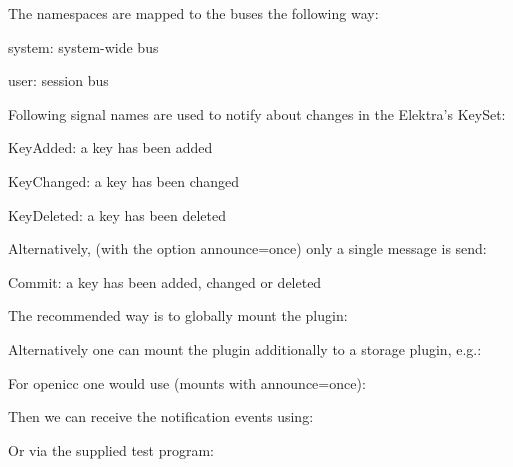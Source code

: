 The namespaces are mapped to the buses the following way\+:


\begin{DoxyItemize}
\item system\+: system-\/wide bus
\item user\+: session bus
\end{DoxyItemize}

Following signal names are used to notify about changes in the Elektra’s Key\+Set\+:


\begin{DoxyItemize}
\item Key\+Added\+: a key has been added
\item Key\+Changed\+: a key has been changed
\item Key\+Deleted\+: a key has been deleted
\end{DoxyItemize}

Alternatively, (with the option announce=once) only a single message is send\+:


\begin{DoxyItemize}
\item Commit\+: a key has been added, changed or deleted
\end{DoxyItemize}

The recommended way is to globally mount the plugin\+:


\begin{DoxyCode}{0}
\end{DoxyCode}


Alternatively one can mount the plugin additionally to a storage plugin, e.\+g.\+:


\begin{DoxyCode}{0}
\end{DoxyCode}


For openicc one would use (mounts with announce=once)\+:


\begin{DoxyCode}{0}
\end{DoxyCode}


Then we can receive the notification events using\+:


\begin{DoxyCode}{0}
\end{DoxyCode}


Or via the supplied test program\+:


